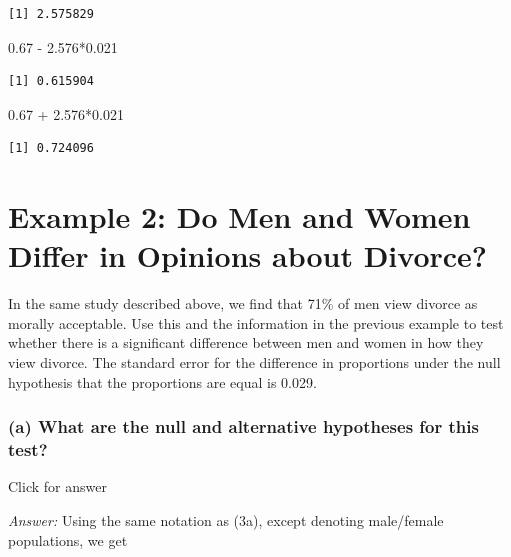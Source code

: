 \documentclass[
]{book}
\newenvironment{Shaded}{\begin{snugshade}}{\end{snugshade}}
\newcommand{\FloatTok}[1]{\textcolor[rgb]{0.00,0.00,0.81}{#1}}
\newcommand{\SpecialCharTok}[1]{\textcolor[rgb]{0.00,0.00,0.00}{#1}}
\begin{document}
\begin{verbatim}
[1] 2.575829
\end{verbatim}

\begin{Shaded}
\begin{Highlighting}[]
\FloatTok{0.67} \SpecialCharTok{{-}} \FloatTok{2.576}\SpecialCharTok{*}\FloatTok{0.021}
\end{Highlighting}
\end{Shaded}

\begin{verbatim}
[1] 0.615904
\end{verbatim}

\begin{Shaded}
\begin{Highlighting}[]
\FloatTok{0.67} \SpecialCharTok{+} \FloatTok{2.576}\SpecialCharTok{*}\FloatTok{0.021}
\end{Highlighting}
\end{Shaded}

\begin{verbatim}
[1] 0.724096
\end{verbatim}

\hypertarget{example-2-do-men-and-women-differ-in-opinions-about-divorce}{%
\section{Example 2: Do Men and Women Differ in Opinions about Divorce?}\label{example-2-do-men-and-women-differ-in-opinions-about-divorce}}

In the same study described above, we find that 71\% of men view divorce as morally acceptable. Use this and the information in the previous example to test whether there is a significant difference between men and women in how they view divorce. The standard error for the difference in proportions under the null hypothesis that the proportions are equal is 0.029.

\hypertarget{a-what-are-the-null-and-alternative-hypotheses-for-this-test-1}{%
\subsubsection{(a) What are the null and alternative hypotheses for this test?}\label{a-what-are-the-null-and-alternative-hypotheses-for-this-test-1}}

Click for answer

\emph{Answer:} Using the same notation as (3a), except denoting male/female populations, we get
\end{document}
